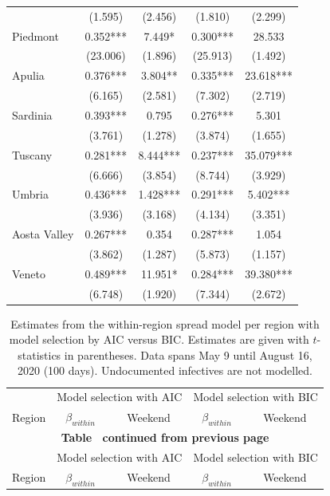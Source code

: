 \documentclass[12pt]{article}
\begin{document}
\begin{appendices}
\begin{longtable}{@{}lcccc@{}}
             & (1.595) & (2.456) & (1.810) & (2.299) \\ 
            Piedmont & 0.352*** & 7.449* & 0.300*** & 28.533 \\ 
             & (23.006) & (1.896) & (25.913) & (1.492) \\ 
            Apulia & 0.376*** & 3.804** & 0.335*** & 23.618*** \\ 
             & (6.165) & (2.581) & (7.302) & (2.719) \\ 
            Sardinia & 0.393*** & 0.795 & 0.276*** & 5.301 \\ 
             & (3.761) & (1.278) & (3.874) & (1.655) \\ 
            Tuscany & 0.281*** & 8.444*** & 0.237*** & 35.079*** \\ 
             & (6.666) & (3.854) & (8.744) & (3.929) \\ 
            Umbria & 0.436*** & 1.428*** & 0.291*** & 5.402*** \\ 
             & (3.936) & (3.168) & (4.134) & (3.351) \\ 
            Aosta Valley & 0.267*** & 0.354 & 0.287*** & 1.054 \\ 
             & (3.862) & (1.287) & (5.873) & (1.157) \\ 
            Veneto & 0.489*** & 11.951* & 0.284*** & 39.380*** \\ 
             & (6.748) & (1.920) & (7.344) & (2.672) \\* \bottomrule
    	\end{longtable}
		
		\begin{longtable}{@{}lcccc@{}}
    		\caption{Estimates from the within-region spread model per region with model selection by AIC versus BIC. Estimates are given with $t$-statistics in parentheses. Data spans May 9 until August 16, 2020 (100 days). Undocumented infectives are not modelled.}
    		\label{tab:model_within_aic_vs_bic}\\
    		\toprule
    		                & \multicolumn{2}{c}{Model selection with AIC} & \multicolumn{2}{c}{Model selection with BIC} \\
    		                \cmidrule(lr){2-3}
                            \cmidrule(lr){4-5}
    		Region          & $\beta_{within}$ & Weekend & $\beta_{within}$ & Weekend \\* \midrule
    		\endfirsthead
    		
    		\multicolumn{5}{c}{{\bfseries Table \thetable\ continued from previous page}} \\
    		\toprule
    		                & \multicolumn{2}{c}{Model selection with AIC} & \multicolumn{2}{c}{Model selection with BIC} \\
    		                \cmidrule(lr){2-3}
                            \cmidrule(lr){4-5}
    		Region          & $\beta_{within}$ & Weekend & $\beta_{within}$ & Weekend \\* \midrule
    		\endhead
    		

\end{longtable}
\end{appendices}
\end{document}

